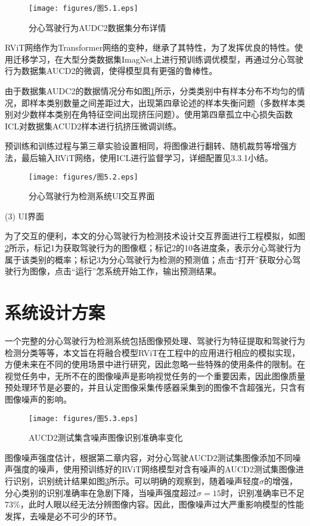 \begin{figure}[!ht]
	\centering
	\texttt{[image: figures/图5.1.eps]}
	\caption{分心驾驶行为AUDC2数据集分布详情}\label{5.1}
\end{figure}


RViT网络作为Transformer网络的变种，继承了其特性，为了发挥优良的特性。使用迁移学习，在大型分类数据集ImagNet上进行预训练调优模型，再通过分心驾驶行为数据集AUCD2的微调，使得模型具有更强的鲁棒性。


由于数据集AUDC2的数据情况分布如图\ref{5.1}所示，分类类别中有样本分布不均匀的情况，即样本类别数量之间差距过大，出现第四章论述的样本失衡问题（多数样本类别对少数样本类别在角特征空间出现挤压问题）。使用第四章孤立中心损失函数ICL对数据集ACUD2样本进行抗挤压微调训练。

预训练和训练过程与第三章实验设置相同，将图像进行翻转、随机裁剪等增强方法，最后输入RViT网络，使用ICL进行监督学习，详细配置见3.3.1小结。

\begin{figure}[!ht]
	\centering
	\texttt{[image: figures/图5.2.eps]}
	\caption{分心驾驶行为检测系统UI交互界面}\label{5.2}
\end{figure}

(3)	UI界面

为了交互的便利，本文的分心驾驶行为检测技术设计交互界面进行工程模拟，如图\ref{5.2}所示，标记1为获取驾驶行为的图像框；标记2的10各进度条，表示分心驾驶行为属于该类别的概率；标记3为分心驾驶行为检测的预测值；点击“打开”获取分心驾驶行为图像，点击“运行”怎系统开始工作，输出预测结果。


\section{系统设计方案}

一个完整的分心驾驶行为检测系统包括图像预处理、驾驶行为特征提取和驾驶行为检测分类等等，本文旨在将融合模型RViT在工程中的应用进行相应的模拟实现，方便未来在不同的使用场景中进行研究，因此忽略一些特殊的使用条件的限制。在视觉任务中，无所不在的图像噪声是影响视觉任务的一个重要因素，因此图像质量预处理环节是必要的，并且认定图像采集传感器采集到的图像不含超强光，只含有图像噪声的影响。

\begin{figure}[!ht]
	\centering
	\texttt{[image: figures/图5.3.eps]}
	\caption{AUCD2测试集含噪声图像识别准确率变化}\label{5.3}
\end{figure}

图像噪声强度估计，根据第二章内容，对分心驾驶AUCD2测试集图像添加不同噪声强度的噪声，使用预训练好的RViT网络模型对含有噪声的AUCD2测试集图像进行识别，识别统计结果如图\ref{5.3}所示。可以明确的观察到，随着噪声轻度$\sigma$的增强，分心类别的识别准确率在急剧下降，当噪声强度超过$\sigma=15$时，识别准确率已不足73\%，此时人眼以经无法分辨图像内容。因此，图像噪声过大严重影响模型的性能发挥，去噪是必不可少的环节。


